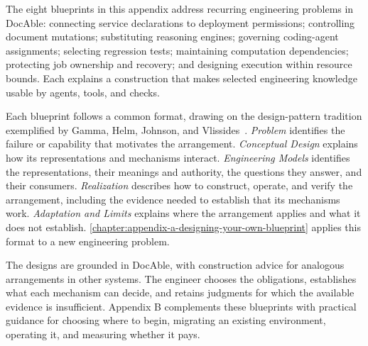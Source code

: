 
The eight blueprints in this appendix address recurring engineering problems in DocAble: connecting service declarations to deployment permissions; controlling document mutations; substituting reasoning engines; governing coding-agent assignments; selecting regression tests; maintaining computation dependencies; protecting job ownership and recovery; and designing execution within resource bounds. Each explains a construction that makes selected engineering knowledge usable by agents, tools, and checks.

Each blueprint follows a common format, drawing on the design-pattern tradition exemplified by Gamma, Helm, Johnson, and Vlissides~\citep{gof1994}. \emph{Problem} identifies the failure or capability that motivates the arrangement. \emph{Conceptual Design} explains how its representations and mechanisms interact. \emph{Engineering Models} identifies the representations, their meanings and authority, the questions they answer, and their consumers. \emph{Realization} describes how to construct, operate, and verify the arrangement, including the evidence needed to establish that its mechanisms work. \emph{Adaptation and Limits} explains where the arrangement applies and what it does not establish. \autoref{chapter:appendix-a-designing-your-own-blueprint} applies this format to a new engineering problem.

The designs are grounded in DocAble, with construction advice for analogous arrangements in other systems. The engineer chooses the obligations, establishes what each mechanism can decide, and retains judgments for which the available evidence is insufficient. Appendix B complements these blueprints with practical guidance for choosing where to begin, migrating an existing environment, operating it, and measuring whether it pays.
